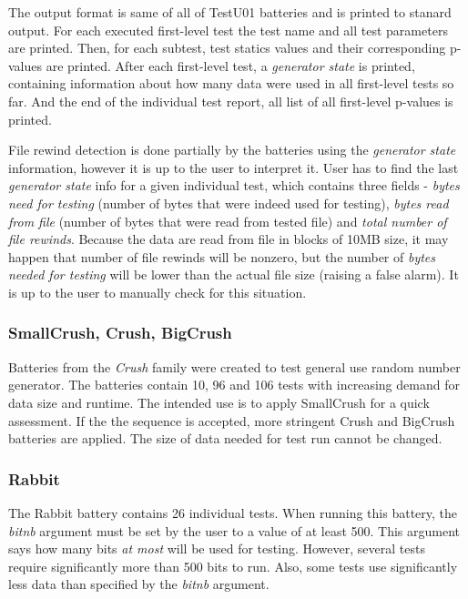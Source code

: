 \documentclass[
  digital,     %
  oneside,     %
  nosansbold,  %
  nocolorbold, %
  nolof,         %
  nolot,         %
]{fithesis4}
\begin{document}
The output format is same of all of TestU01 batteries and is printed to stanard output. For each executed first-level test the test name and all test parameters are printed. Then, for each subtest, test statics values and their corresponding p-values are printed. After each first-level test, a \emph{generator state} is printed, containing information about how many data were used in all first-level tests so far. And the end of the individual test report, all list of all first-level p-values is printed.

File rewind detection is done partially by the batteries using the \emph{generator state} information, however it is up to the user to interpret it. User has to find the last \emph{generator state} info for a given individual test, which contains three fields - \emph{bytes need for testing} (number of bytes that were indeed used for testing), \emph{bytes read from file} (number of bytes that were read from tested file) and \emph{total number of file rewinds}. Because the data are read from file in blocks of 10MB size, it may happen that number of file rewinds will be nonzero, but the number of \emph{bytes needed for testing} will be lower than the actual file size (raising a false alarm). It is up to the user to manually check for this situation. %


\subsubsection{SmallCrush, Crush, BigCrush}
Batteries from the \emph{Crush} family were created to test general use random number generator. The batteries contain 10, 96 and 106 tests with increasing demand for data size and runtime. The intended use is to apply SmallCrush for a quick assessment. If the the sequence is accepted, more stringent Crush and BigCrush batteries are applied. \cite[p. 242]{tu01_guide} The size of data needed for test run cannot be changed.

\subsubsection{Rabbit}
The Rabbit battery contains 26 individual tests. When running this battery, the \emph{bit\textunderscore nb} argument must be set by the user to a value of at least 500. This argument says how many bits \emph{at most} will be used for testing. \cite[p. 152]{tu01_guide} However, several tests require significantly more than 500 bits to run. Also, some tests use significantly less data than specified by the \emph{bit\textunderscore nb} argument.
\end{document}
